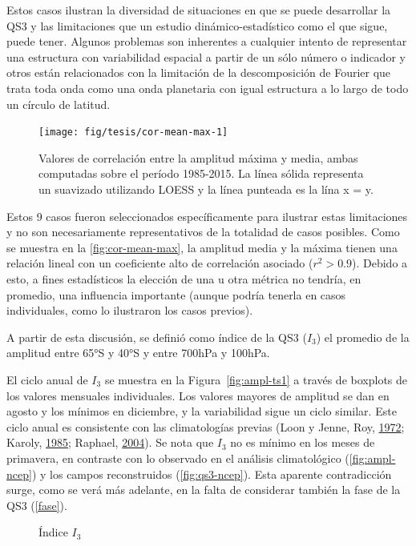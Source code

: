 \documentclass[spanish,a4paper,12pt,oneside]{book}
\begin{document}
Estos casos ilustran la diversidad de situaciones en que se puede
desarrollar la QS3 y las limitaciones que un estudio
dinámico-estadístico como el que sigue, puede tener. Algunos problemas
son inherentes a cualquier intento de representar una estructura con
variabilidad espacial a partir de un sólo número o indicador y otros
están relacionados con la limitación de la descomposición de Fourier que
trata toda onda como una onda planetaria con igual estructura a lo largo
de todo un círculo de latitud.

\begin{figure}
\texttt{[image: fig/tesis/cor-mean-max-1]} \caption{Valores de correlación entre la amplitud máxima y media, ambas computadas sobre el período 1985-2015. La línea sólida representa un suavizado utilizando LOESS y la línea punteada es la lína x = y.}\label{fig:cor-mean-max}
\end{figure}

Estos 9 casos fueron seleccionados específicamente para ilustrar estas
limitaciones y no son necesariamente representativos de la totalidad de
casos posibles. Como se muestra en la \autoref{fig:cor-mean-max}, la
amplitud media y la máxima tienen una relación lineal con un coeficiente
alto de correlación asociado (\(r^2>0.9\)). Debido a esto, a fines
estadísticos la elección de una u otra métrica no tendría, en promedio,
una influencia importante (aunque podría tenerla en casos individuales,
como lo ilustraron los casos previos).

A partir de esta discusión, se definió como índice de la QS3 (\(I_3\))
el promedio de la amplitud entre 65°S y 40°S y entre 700hPa y 100hPa.

El ciclo anual de \(I_3\) se muestra en la Figura~\ref{fig:ampl-ts1} a
través de boxplots de los valores mensuales individuales. Los valores
mayores de amplitud se dan en agosto y los mínimos en diciembre, y la
variabilidad sigue un ciclo similar. Este ciclo anual es consistente con
las climatologías previas (Loon y Jenne, Roy,
\protect\hyperlink{ref-Loon1972}{1972}; Karoly,
\protect\hyperlink{ref-Karoly1985}{1985}; Raphael,
\protect\hyperlink{ref-Raphael2004}{2004}). Se nota que \(I_3\) no es
mínimo en los meses de primavera, en contraste con lo observado en el
análisis climatológico (\autoref{fig:ampl-ncep}) y los campos
reconstruidos (\autoref{fig:qs3-ncep}). Esta aparente contradicción
surge, como se verá más adelante, en la falta de considerar también la
fase de la QS3 (\autoref{fase}).

\begin{figure}
\newline{}\caption{Índice $I_3$}\label{fig:ampl-ts}
\end{figure}
\end{document}
